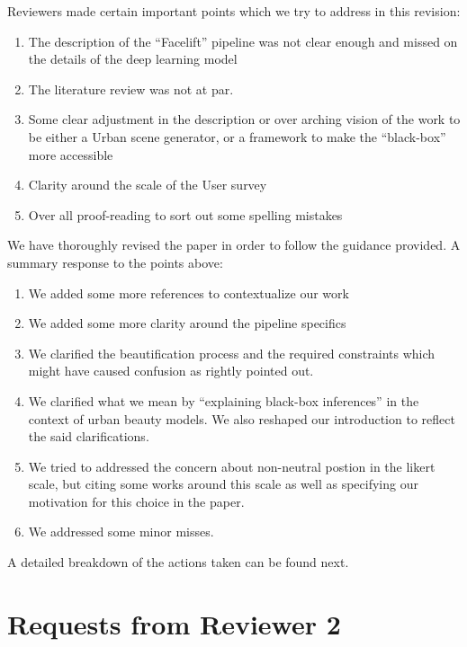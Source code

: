 \documentclass{paper}
\newenvironment{myquote}
{\definecolor{shadecolor}{rgb}{0.9,0.95,1} \begin{shaded*} \sf \em}
{\em\end{shaded*}}
\begin{document}
\begin{myquote}

\noindent Reviewers made certain important points which we try to address in this revision:

\begin{enumerate}
\item The description of the ``Facelift'' pipeline was not clear enough and missed on the details of the deep learning model
\item The literature review was not at par. 
\item Some clear adjustment in the description or over arching vision of the work to be either a Urban scene generator, or a framework to make the ``black-box'' more accessible
\item Clarity around the scale of the User survey
\item Over all proof-reading to sort out some spelling mistakes
\end{enumerate}

\noindent We have thoroughly revised the paper in order to follow the guidance provided. A summary response to the points above:

\begin{enumerate}

\item We added some more references to contextualize our work
\item We added some more clarity around the pipeline specifics
\item We clarified the beautification process and the required constraints which might have caused confusion as rightly pointed out.
\item We clarified what we mean by ``explaining black-box inferences'' in the context of urban beauty models. We also reshaped our introduction to reflect the said clarifications.
\item We tried to addressed the concern about non-neutral postion in the likert scale, but citing some works around this scale as well as specifying our motivation for this choice in the paper. 
\item We addressed some minor misses.


\end{enumerate}

\end{myquote}

A detailed breakdown of the actions taken can be found next.

\section*{Requests from Reviewer 2}
\end{document}
